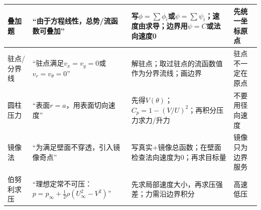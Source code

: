 \documentclass[UTF8,a4paper]{ctexart}
\begin{document}
\begin{tabular}{|L{0.16\textwidth}|L{0.25\textwidth}|L{0.36\textwidth}|L{0.18\textwidth}|}\hline
叠加题 & “由于方程线性，总势/流函数可叠加” & 写$\phi=\sum\phi_i$或$\psi=\sum\psi_i$；速度由求导；边界用$\psi=C$或法向速度0 & 先统一坐标原点\\\hline
驻点/分界线 & “驻点满足$v_x=v_y=0$或$v_r=v_\theta=0$” & 解驻点；取过驻点的流函数值作为分界流线；画边界 & 驻点不一定在原点\\\hline
圆柱压力 & “表面$r=a$，用表面切向速度” & 先得$V(\theta)$；$C_p=1-(V/U)^2$；再积分压力求力/升力 & 不要用径向速度\\\hline
镜像法 & “为满足壁面不穿透，引入镜像奇点” & 写真实+镜像总函数；在壁面检查法向速度为0；再求目标量 & 镜像只为边界服务\\\hline
伯努利求压 & “理想定常不可压：$p=p_\infty+\frac12\rho(U_\infty^2-V^2)$” & 先求局部速度大小，再求压强差；力需沿边界积分 & 高速低压\\\hline
\end{tabular}
\newpage
\end{document}
